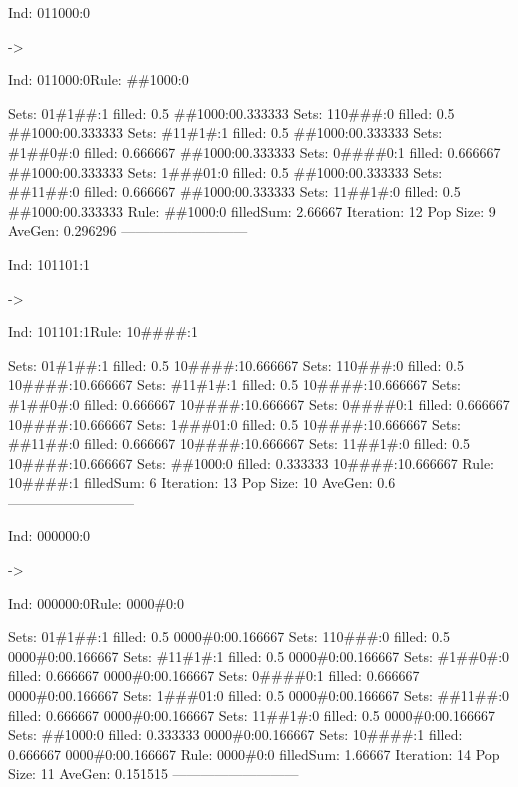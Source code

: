 \documentclass[12pt,openright,twoside,letterpaper,english,brazil,sumario=tradicional]{abntex2}
\begin{document}
\begin{flushleft}\ttfamily
\par Ind: 011000:0\end{flushleft} -> \begin{flushleft}\ttfamily
\par Ind: 011000:0Rule: \#\#1000:0
\end{flushleft}  Sets:	01\#1\#\#:1 filled: 0.5 \#\#1000:0{0.333333}
  Sets:	110\#\#\#:0 filled: 0.5 \#\#1000:0{0.333333}
  Sets:	\#11\#1\#:1 filled: 0.5 \#\#1000:0{0.333333}
  Sets:	\#1\#\#0\#:0 filled: 0.666667 \#\#1000:0{0.333333}
  Sets:	0\#\#\#\#0:1 filled: 0.666667 \#\#1000:0{0.333333}
  Sets:	1\#\#\#01:0 filled: 0.5 \#\#1000:0{0.333333}
  Sets:	\#\#11\#\#:0 filled: 0.666667 \#\#1000:0{0.333333}
  Sets:	11\#\#1\#:0 filled: 0.5 \#\#1000:0{0.333333}
Rule:	\#\#1000:0
filledSum: 2.66667
Iteration: 12 Pop Size: 9 AveGen: 0.296296
---------------------------

\begin{flushleft}\ttfamily
\par Ind: 101101:1\end{flushleft} -> \begin{flushleft}\ttfamily
\par Ind: 101101:1Rule: 10\#\#\#\#:1
\end{flushleft}  Sets:	01\#1\#\#:1 filled: 0.5 10\#\#\#\#:1{0.666667}
  Sets:	110\#\#\#:0 filled: 0.5 10\#\#\#\#:1{0.666667}
  Sets:	\#11\#1\#:1 filled: 0.5 10\#\#\#\#:1{0.666667}
  Sets:	\#1\#\#0\#:0 filled: 0.666667 10\#\#\#\#:1{0.666667}
  Sets:	0\#\#\#\#0:1 filled: 0.666667 10\#\#\#\#:1{0.666667}
  Sets:	1\#\#\#01:0 filled: 0.5 10\#\#\#\#:1{0.666667}
  Sets:	\#\#11\#\#:0 filled: 0.666667 10\#\#\#\#:1{0.666667}
  Sets:	11\#\#1\#:0 filled: 0.5 10\#\#\#\#:1{0.666667}
  Sets:	\#\#1000:0 filled: 0.333333 10\#\#\#\#:1{0.666667}
Rule:	10\#\#\#\#:1
filledSum: 6
Iteration: 13 Pop Size: 10 AveGen: 0.6
---------------------------

\begin{flushleft}\ttfamily
\par Ind: 000000:0\end{flushleft} -> \begin{flushleft}\ttfamily
\par Ind: 000000:0Rule: 0000\#0:0
\end{flushleft}  Sets:	01\#1\#\#:1 filled: 0.5 0000\#0:0{0.166667}
  Sets:	110\#\#\#:0 filled: 0.5 0000\#0:0{0.166667}
  Sets:	\#11\#1\#:1 filled: 0.5 0000\#0:0{0.166667}
  Sets:	\#1\#\#0\#:0 filled: 0.666667 0000\#0:0{0.166667}
  Sets:	0\#\#\#\#0:1 filled: 0.666667 0000\#0:0{0.166667}
  Sets:	1\#\#\#01:0 filled: 0.5 0000\#0:0{0.166667}
  Sets:	\#\#11\#\#:0 filled: 0.666667 0000\#0:0{0.166667}
  Sets:	11\#\#1\#:0 filled: 0.5 0000\#0:0{0.166667}
  Sets:	\#\#1000:0 filled: 0.333333 0000\#0:0{0.166667}
  Sets:	10\#\#\#\#:1 filled: 0.666667 0000\#0:0{0.166667}
Rule:	0000\#0:0
filledSum: 1.66667
Iteration: 14 Pop Size: 11 AveGen: 0.151515
---------------------------
\end{document}
